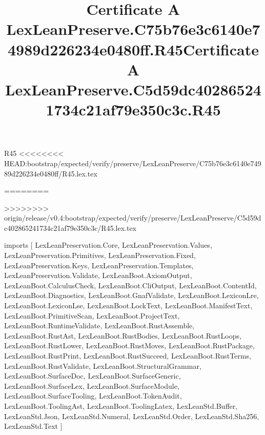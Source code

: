 \begin{lexlean}{R45}
<<<<<<<< HEAD:bootstrap/expected/verify/preserve/LexLeanPreserve/C75b76e3c6140e74989d226234e0480ff/R45.lex.tex
\title{Certificate A LexLeanPreserve.C75b76e3c6140e74989d226234e0480ff.R45}
========
\title{Certificate A LexLeanPreserve.C5d59dc402865241734c21af79e350c3c.R45}
>>>>>>>> origin/release/v0.4:bootstrap/expected/verify/preserve/LexLeanPreserve/C5d59dc402865241734c21af79e350c3c/R45.lex.tex
\begin{coremodule}
imports [
  LexLeanPreservation.Core,
  LexLeanPreservation.Values,
  LexLeanPreservation.Primitives,
  LexLeanPreservation.Fixed,
  LexLeanPreservation.Keys,
  LexLeanPreservation.Templates,
  LexLeanPreservation.Validate,
  LexLeanBoot.AxiomOutput,
  LexLeanBoot.CalculusCheck,
  LexLeanBoot.CliOutput,
  LexLeanBoot.ContentId,
  LexLeanBoot.Diagnostics,
  LexLeanBoot.GnafValidate,
  LexLeanBoot.LexiconLre,
  LexLeanBoot.LexiconLse,
  LexLeanBoot.LockText,
  LexLeanBoot.ManifestText,
  LexLeanBoot.PrimitiveScan,
  LexLeanBoot.ProjectText,
  LexLeanBoot.RuntimeValidate,
  LexLeanBoot.RustAssemble,
  LexLeanBoot.RustAst,
  LexLeanBoot.RustBodies,
  LexLeanBoot.RustLoops,
  LexLeanBoot.RustLower,
  LexLeanBoot.RustMoves,
  LexLeanBoot.RustPackage,
  LexLeanBoot.RustPrint,
  LexLeanBoot.RustSucceed,
  LexLeanBoot.RustTerms,
  LexLeanBoot.RustValidate,
  LexLeanBoot.StructuralGrammar,
  LexLeanBoot.SurfaceDoc,
  LexLeanBoot.SurfaceGeneric,
  LexLeanBoot.SurfaceLex,
  LexLeanBoot.SurfaceModule,
  LexLeanBoot.SurfaceTooling,
  LexLeanBoot.TokenAudit,
  LexLeanBoot.ToolingAst,
  LexLeanBoot.ToolingLatex,
  LexLeanStd.Buffer,
  LexLeanStd.Json,
  LexLeanStd.Numeral,
  LexLeanStd.Order,
  LexLeanStd.Sha256,
  LexLeanStd.Text
]


\end{coremodule}
\end{lexlean}
